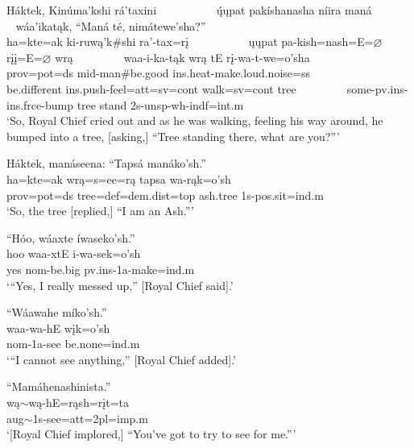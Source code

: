 \begin{exe}
\item\label{EJ75} \glll Háktek, Kinúma'kshi rá'taxini ~ ~ ~ ~ ~ ~ ų́ųpat pakíshanasha níira maná ~ ~ ~ ~ ~ wáa'ikatąk, ``Maná té, nimátewe'sha?''\\
ha=kte=ak ki-ruwą'k\#shi ra'-tax=rį ~ ~ ~ ~ ~ ~ ųųpat pa-kish=nash=E=$\varnothing$ rįį=E=$\varnothing$ wrą ~ ~ ~ ~ ~ waa-i-ka-tąk wrą tE rį-wa-t-we=o'sha\\
prov=pot=ds mid-\textnormal{man}\#\textnormal{be.good} ins.heat-\textnormal{make.loud.noise}=ss ~ ~ ~ ~ ~ ~ \textnormal{be.different} ins.push-\textnormal{feel}=att=sv=cont \textnormal{walk}=sv=cont \textnormal{tree} ~ ~ ~ ~ ~ \textnormal{some}-pv.ins-ins.frce-\textnormal{bump} \textnormal{tree} \textnormal{stand} 2s-unsp-wh-indf=int.m\\
\glt `So, Royal Chief cried out and as he was walking, feeling his way around, he bumped into a tree, [asking,] ``Tree standing there, what are you?{''}'

\item\label{EJ76} \glll Háktek, manáseena: ``Tapsá manáko'sh.''\\
ha=kte=ak wrą=s=ee=rą tapsa wa-rąk=o'sh\\
prov=pot=ds \textnormal{tree}=def=dem.dist=top \textnormal{ash.tree} 1s-pos.sit=ind.m\\
\glt `So, the tree [replied,] ``I am an Ash.{''}'

\item\label{EJ77} \glll ``Hóo, wáaxte íwaseko'sh.''\\
hoo waa-xtE i-wa-sek=o'sh\\
\textnormal{yes} nom-\textnormal{be.big} pv.ins-1a-\textnormal{make}=ind.m\\
\glt `{``}Yes, I really messed up,{''} [Royal Chief said].'

\item\label{EJ78} \glll ``Wáawahe míko'sh.''\\
waa-wa-hE wįk=o'sh\\
nom-1a-\textnormal{see} \textnormal{be.none}=ind.m\\
\glt `{``}I cannot see anything,{''} [Royal Chief added].'

\item\label{EJ79} \glll ``Mamáhenashinista.''\\
wą$\sim$wą-hE=rąsh=rįt=ta\\
aug$\sim$1s-\textnormal{see}=att=2pl=imp.m\\
\glt `[Royal Chief implored,] ``You've got to try to see for me.{''}'


\end{exe}
